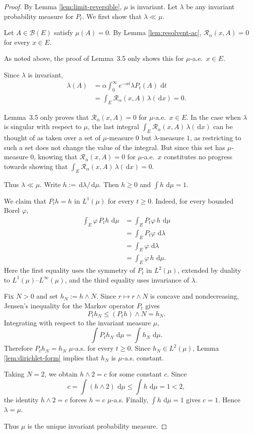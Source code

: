 \documentclass[12pt]{article}
\numberwithin{equation}{section}
\newcommand{\dd}{\,\mathrm d}
\newcommand{\1}{\mathbf 1}
\newcommand{\cB}{\mathcal B}
\newcommand{\review}[1]{\begin{reviewbox}#1\end{reviewbox}}
\begin{document}
\begin{proof}
By Lemma \ref{lem:limit-reversible}, $\mu$ is invariant. Let $\lambda$ be any
invariant probability measure for $P_t$. We first show that $\lambda\ll\mu$.

Let $A\in\cB(E)$ satisfy $\mu(A)=0$. By Lemma \ref{lem:resolvent-ac},
$\mathcal R_\alpha(x,A)=0$ for every $x\in E$.\review{As noted above, the proof of Lemma~3.5 only shows this for $\mu$-a.e.~$x\in E$.} Since $\lambda$ is invariant,
\[
\begin{aligned}
        \lambda(A)
        &=
        \alpha\int_0^\infty e^{-\alpha t}\lambda P_t(A)\,\dd t        \\
        &=
        \int_E \mathcal R_\alpha(x,A)\,\lambda(\dd x)
        =0.
\end{aligned}
\]
\review{Lemma~3.5 only proves that $\mathcal{R}_\alpha(x,A)=0$ for $\mu$-a.e.~$x\in E$. In the case when $\lambda$ is singular with respect to $\mu$, the last integral $\int_E \mathcal R_\alpha(x,A)\,\lambda(\dd x)$ can be thought of as taken over a set of $\mu$-measure $0$ but $\lambda$-measure $1$, as restricting to such a set does not change the value of the integral. But since this set has $\mu$-measure $0$, knowing that $\mathcal{R}_\alpha(x,A)=0$ for $\mu$-a.e.~$x$ constitutes no progress towards showing that $\int_E \mathcal R_\alpha(x,A)\,\lambda(\dd x)=0$.}
Thus $\lambda\ll\mu$. Write $h:=\dd\lambda/\dd\mu$. Then $h\geq0$ and
$\int h\,\dd\mu=1$.

We claim that $P_t h=h$ in $L^1(\mu)$ for every $t\geq0$. Indeed, for every bounded
Borel $\varphi$,
\[
\begin{aligned}
        \int_E \varphi\,P_t h\,\dd\mu
        &=
        \int_E P_t\varphi\, h\,\dd\mu                         \\
        &=
        \int_E P_t\varphi\,\dd\lambda                         \\
        &=
        \int_E \varphi\,\dd\lambda                            \\
        &=
        \int_E \varphi\,h\,\dd\mu .
\end{aligned}
\]
Here the first equality uses the symmetry of $P_t$ in $L^2(\mu)$, extended by
duality to $L^1(\mu)$--$L^\infty(\mu)$, and the third equality uses invariance of
$\lambda$.

Fix $N>0$ and set $h_N:=h\wedge N$. Since $r\mapsto r\wedge N$ is concave and
nondecreasing, Jensen's inequality for the Markov operator $P_t$ gives
\[
        P_t h_N \leq (P_t h)\wedge N=h_N.
\]
Integrating with respect to the invariant measure $\mu$,
\[
        \int P_t h_N\,\dd\mu=\int h_N\,\dd\mu.
\]
Therefore $P_t h_N=h_N$ $\mu$-a.s. for every $t\geq0$. Since $h_N\in L^2(\mu)$,
Lemma \ref{lem:dirichlet-form} implies that $h_N$ is $\mu$-a.s. constant.

Taking $N=2$, we obtain $h\wedge2=c$ for some constant $c$. Since
\[
        c=\int (h\wedge2)\,\dd\mu\leq \int h\,\dd\mu=1<2,
\]
the identity $h\wedge2=c$ forces $h=c$ $\mu$-a.s. Finally,
$\int h\,\dd\mu=1$ gives $c=1$. Hence $\lambda=\mu$.

Thus $\mu$ is the unique invariant probability measure.
\end{proof}
\end{document}
